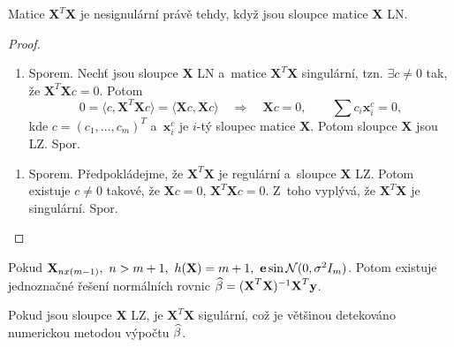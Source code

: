 \begin{theorem}
	Matice $\textbf{X}^T\textbf{X}$ je nesignulární právě tehdy, když jsou sloupce matice $\textbf{X}$ LN.
	\begin{proof}
		\begin{enumerate}[$\Leftarrow$]
			\item Sporem. Nechť jsou sloupce $\textbf{X}$ LN a~matice $\textbf{X}^T\textbf{X}$ singulární, tzn. $\exists c\neq0$ tak, že $\textbf{X}^T\textbf{X}c=0$. Potom
			$$ 0=\langle c,\textbf{X}^T\textbf{X}c\rangle=\langle \textbf{X}c,\textbf{X}c\rangle\quad \Rightarrow\quad\textbf{X}c=0,\qquad\sum c_i\textbf{x}_i^c=0,$$
			kde $c=(c_1,...,c_m)^T$ a~$\textbf{x}_i^c$ je $i$-tý sloupec matice $\textbf{X}$. Potom sloupce $\textbf{X}$ jsou LZ. Spor.
		\end{enumerate}
	\begin{enumerate}[$\Rightarrow$]
	\item Sporem. Předpokládejme, že $\textbf{X}^T\textbf{X}$ je regulární a~sloupce $\textbf{X}$ LZ. Potom existuje $c\neq0$ takové, že $\textbf{X}c=0$, $\textbf{X}^T\textbf{X}c=0$. Z~toho vyplývá, že $\textbf{X}^T\textbf{X}$ je singulární. Spor.
\end{enumerate}
	\end{proof}
\end{theorem}
\begin{remark}
	Pokud $\textbf{X}_{nx(m-1)},~n>m+1,~h(\textbf{X})=m+1,~\textbf{e}\sin\mathcal{N}(0,\sigma^2 I_m)$. Potom existuje jednoznačné řešení normálních rovnic $\widehat{\beta}=(\textbf{X}^T\textbf{X})^{-1}\textbf{X}^T\textbf{y}$.
\end{remark}
\begin{remark}
	Pokud jsou sloupce $\textbf{X}$ LZ, je $\textbf{X}^T\textbf{X}$ sigulární, což je většinou detekováno numerickou metodou výpočtu $\widehat{\beta}$.
\end{remark}
